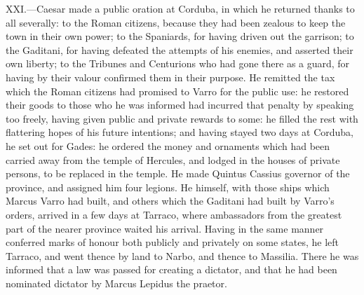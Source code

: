 XXI.—Caesar made a public oration at Corduba, in which he returned
thanks to all severally: to the Roman citizens, because they had been
zealous to keep the town in their own power; to the Spaniards, for
having driven out the garrison; to the Gaditani, for having defeated the
attempts of his enemies, and asserted their own liberty; to the Tribunes
and Centurions who had gone there as a guard, for having by their valour
confirmed them in their purpose. He remitted the tax which the Roman
citizens had promised to Varro for the public use: he restored their
goods to those who he was informed had incurred that penalty by speaking
too freely, having given public and private rewards to some: he filled
the rest with flattering hopes of his future intentions; and having
stayed two days at Corduba, he set out for Gades: he ordered the money
and ornaments which had been carried away from the temple of Hercules,
and lodged in the houses of private persons, to be replaced in the
temple. He made Quintus Cassius governor of the province, and assigned
him four legions. He himself, with those ships which Marcus Varro had
built, and others which the Gaditani had built by Varro's orders,
arrived in a few days at Tarraco, where ambassadors from the greatest
part of the nearer province waited his arrival. Having in the same
manner conferred marks of honour both publicly and privately on some
states, he left Tarraco, and went thence by land to Narbo, and thence to
Massilia. There he was informed that a law was passed for creating a
dictator, and that he had been nominated dictator by Marcus Lepidus the
praetor.

